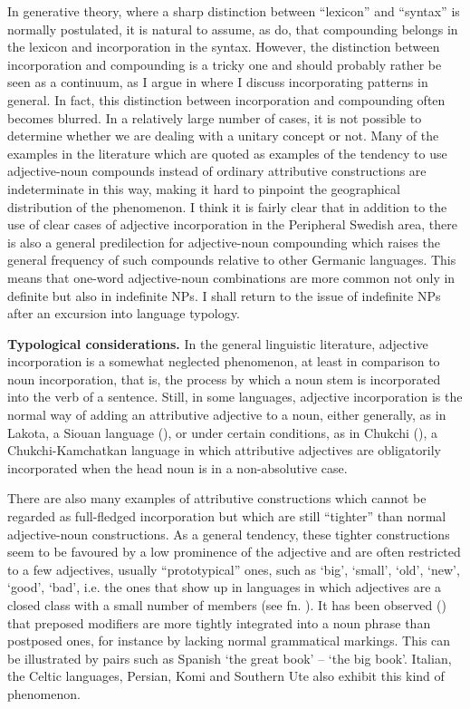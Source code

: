 In generative theory, where a sharp distinction between “lexicon” and “syntax” is normally postulated, it is natural to assume, as \citet{SandströmEtAl} do, that compounding belongs in the lexicon and incorporation in the syntax. However, the distinction between incorporation and compounding is a tricky one and should probably rather be seen as a continuum, as I argue in \citet[Ch.10]{Dahl2004} where I discuss incorporating patterns in general. In fact, this distinction between incorporation and compounding often becomes blurred. In a relatively large number of cases, it is not possible to determine whether we are dealing with a unitary concept or not. Many of the examples in the literature which are quoted as examples of the tendency to use adjective-noun compounds instead of ordinary attributive constructions are indeterminate in this way, making it hard to pinpoint the geographical distribution of the phenomenon. I think it is fairly clear that in addition to the use of clear cases of adjective incorporation in the Peripheral Swedish area, there is also a general predilection for adjective-noun compounding which raises the general frequency of such compounds relative to other Germanic languages. This means that one-word adjective-noun combinations are more common not only in definite but also in indefinite NPs. I shall return to the issue of indefinite NPs after an excursion into language typology.

\textbf{Typological considerations.} In the general linguistic literature, adjective incorporation is a somewhat neglected phenomenon, at least in comparison to noun incorporation, that is, the process by which a noun stem is incorporated into the verb of a sentence. Still, in some languages, adjective incorporation is the normal way of adding an attributive adjective to a noun, either generally, as in Lakota, a Siouan language (\citet{BoasEtAl}), or under certain conditions, as in Chukchi (\citet[526]{Muravyova1998}), a Chukchi-Kamchatkan language in which attributive adjectives are obligatorily incorporated when the head noun is in a non-absolutive case.

There are also many examples of attributive constructions which cannot be regarded as full-fledged incorporation but which are still “tighter” than normal adjective-noun constructions. As a general tendency, these tighter constructions seem to be favoured by a low prominence of the adjective and are often restricted to a few adjectives, usually “prototypical” ones, such as ‘big’, ‘small’, ‘old’, ‘new’, ‘good’, ‘bad’, i.e. the ones that show up in languages in which adjectives are a closed class with a small number of members (see fn. ). It has been observed (\citet{CroftEtAl}) that preposed modifiers are more tightly integrated into a noun phrase than postposed ones, for instance by lacking normal grammatical markings. This can be illustrated by pairs such as Spanish ‘the great book’ –  ‘the big book’. Italian, the Celtic languages, Persian, Komi and Southern Ute also exhibit this kind of phenomenon. 

